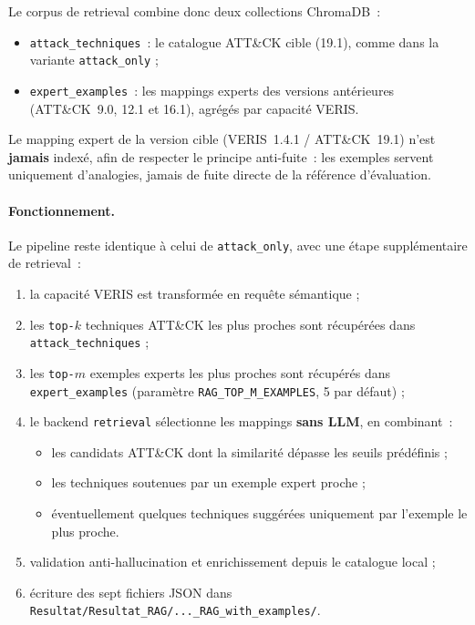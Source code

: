 \documentclass[a4paper,12pt]{article}
\begin{document}
Le corpus de retrieval combine donc deux collections ChromaDB~:
\begin{itemize}
    \item \texttt{attack\_techniques}~: le catalogue ATT\&CK cible (19.1),
          comme dans la variante \texttt{attack\_only} ;
    \item \texttt{expert\_examples}~: les mappings experts des versions
          antérieures (ATT\&CK~9.0, 12.1 et 16.1), agrégés par capacité VERIS.
\end{itemize}

\noindent
Le mapping expert de la version cible (VERIS~1.4.1 / ATT\&CK~19.1) n'est
\textbf{jamais} indexé, afin de respecter le principe anti-fuite~: les exemples
servent uniquement d'analogies, jamais de fuite directe de la référence
d'évaluation.

\paragraph{Fonctionnement.}
Le pipeline reste identique à celui de \texttt{attack\_only}, avec une étape
supplémentaire de retrieval~:
\begin{enumerate}
    \item la capacité VERIS est transformée en requête sémantique ;
    \item les \texttt{top-$k$} techniques ATT\&CK les plus proches sont
          récupérées dans \texttt{attack\_techniques} ;
    \item les \texttt{top-$m$} exemples experts les plus proches sont
          récupérés dans \texttt{expert\_examples} (paramètre
          \texttt{RAG\_TOP\_M\_EXAMPLES}, 5 par défaut) ;
    \item le backend \texttt{retrieval} sélectionne les mappings \textbf{sans LLM},
          en combinant~:
          \begin{itemize}
              \item les candidats ATT\&CK dont la similarité dépasse les seuils
                    prédéfinis ;
              \item les techniques soutenues par un exemple expert proche ;
              \item éventuellement quelques techniques suggérées uniquement par
                    l'exemple le plus proche.
          \end{itemize}
    \item validation anti-hallucination et enrichissement depuis le catalogue
          local ;
    \item écriture des sept fichiers JSON dans
          \texttt{Resultat/Resultat\_RAG/...\_RAG\_with\_examples/}.
\end{enumerate}
\end{document}
